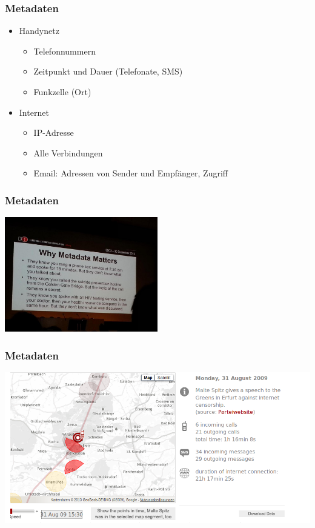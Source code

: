 \documentclass[12pt]{beamer}
\begin{document}
\begin{frame}
  \frametitle{Metadaten}
  \begin{itemize}
    \item<2-> Handynetz
      \begin{itemize}
        \item<3-> Telefonnummern
        \item<4-> Zeitpunkt und Dauer (Telefonate, SMS)
        \item<5-> Funkzelle (Ort)
      \end{itemize}
    \item<6->Internet
      \begin{itemize}
        \item<7-> IP-Adresse
        \item<8-> Alle Verbindungen
        \item<9-> Email: Adressen von Sender und Empfänger, Zugriff
      \end{itemize}
  \end{itemize}
\end{frame}

\begin{frame}
  \frametitle{Metadaten}
    \begin{center}
      \includegraphics[height=5cm]{img/metadata-matters.jpg}
    \end{center}
\end{frame}

\begin{frame}
    \frametitle{Metadaten}
    \includegraphics[height=0.7\textheight]{img/maltespitz.png}
\end{frame}
\end{document}
